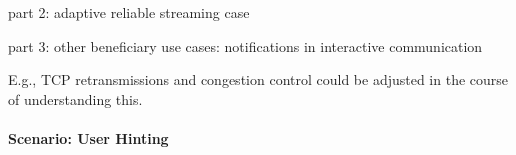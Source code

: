 part 2: adaptive reliable streaming case

part 3: other beneficiary use cases: notifications in interactive communication

 E.g., \gls{TCP} retransmissions and congestion control could be adjusted in the course of understanding this.




\paragraph{Scenario: User Hinting}









		


